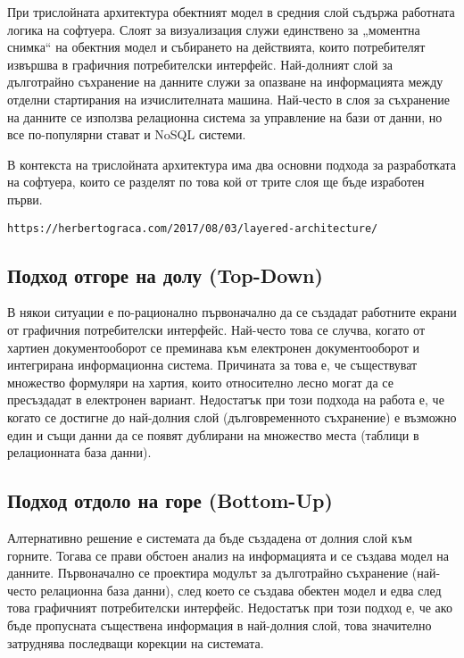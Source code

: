 При трислойната архитектура обектният модел в средния слой съдържа работната логика на софтуера. Слоят за визуализация служи единствено за „моментна снимка“ на обектния модел и събирането на действията, които потребителят извършва в графичния потребителски интерфейс. Най-долният слой за дълготрайно съхранение на данните служи за опазване на информацията между отделни стартирания на изчислителната машина. Най-често в слоя за съхранение на данните се използва релационна система за управление на бази от данни, но все по-популярни стават и NoSQL системи. 

В контекста на трислойната архитектура има два основни подхода за разработката на софтуера, които се разделят по това кой от трите слоя ще бъде изработен първи. 

\begin{lstlisting}
https://herbertograca.com/2017/08/03/layered-architecture/
\end{lstlisting}

\subsection{Подход отгоре на долу (Top-Down)}

В някои ситуации е по-рационално първоначално да се създадат работните екрани от графичния потребителски интерфейс. Най-често това се случва, когато от хартиен документооборот се преминава към електронен документооборот и интегрирана информационна система. Причината за това е, че съществуват множество формуляри на хартия, които относително лесно могат да се пресъздадат в електронен вариант. Недостатък при този подхода на работа е, че когато се достигне до най-долния слой (дълговременното съхранение) е възможно един и същи данни да се появят дублирани на множество места (таблици в релационната база данни). 

\subsection{Подход отдоло на горе (Bottom-Up)}

Алтернативно решение е системата да бъде създадена от долния слой към горните. Тогава се прави обстоен анализ на информацията и се създава модел на данните. Първоначално се проектира модулът за дълготрайно съхранение (най-често релационна база данни), след което се създава обектен модел и едва след това графичният потребителски интерфейс. Недостатък при този подход е, че ако бъде пропусната съществена информация в най-долния слой, това значително затруднява последващи корекции на системата. 

